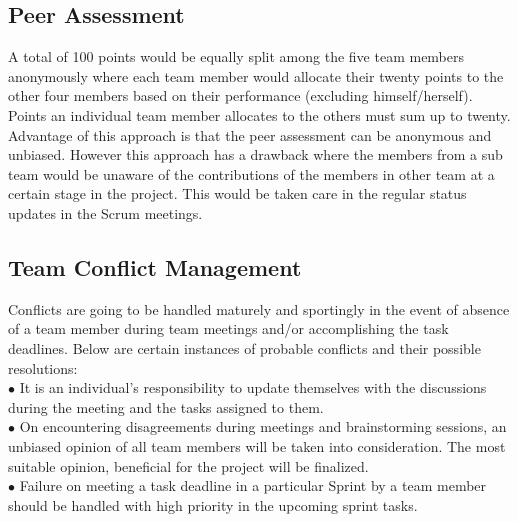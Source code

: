 \documentclass[11pt]{article}
\begin{document}
		\subsection{Peer Assessment}\label{SubSec-PA} A total of 100 points would be equally split among the five team members anonymously where each team member would allocate their twenty points to the other four members based on their performance (excluding himself/herself). Points an individual team member allocates to the others must sum up to twenty. \\
Advantage of this approach is that the peer assessment can be anonymous and unbiased. However this approach has a drawback where the members from a sub team would be unaware of the contributions of the members in other team at a certain stage in the project. This would be taken care in the regular status updates in the Scrum meetings.

		\subsection{Team Conflict Management}\label{SubSec-TCM} Conflicts are going to be handled maturely and sportingly in the event of absence of a team member during team meetings and/or accomplishing the task deadlines. Below are certain instances of probable conflicts and their possible resolutions: \\
		      $\bullet$ It is an individual\rq s responsibility to update themselves with the discussions during the meeting and the tasks assigned to them. \\
			$\bullet$ On encountering disagreements during meetings and brainstorming sessions, an unbiased opinion of all team members will be taken into consideration. The most suitable opinion, beneficial for the project will be finalized. \\
		 	$\bullet$ Failure on meeting a task deadline in a particular Sprint by a team member should be handled with high priority in the upcoming sprint tasks. 
\end{document}

